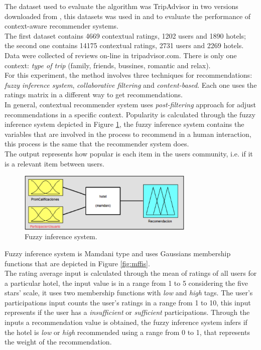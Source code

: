 The dataset used to evaluate the algorithm was TripAdvisor in two versions
downloaded from  \cite{linkzeng}, this datasets was used in
\cite{zheng2014context} and  \cite{zheng2012differential} to  evaluate
the performance of context-aware recommender systems. \\The first
dataset contains 4669 contextual ratings, 1202 users and 1890 hotels;
the second one contains 14175 contextual ratings, 2731 users and
2269 hotels.  Data were collected of reviews on-line in tripadvisor.com.
There is only one context: \textit{type of trip} (family, friends,
bussines, romantic and relax).\\ 
For this experiment, the method involves  three techniques 
for recommendations:  \textit{fuzzy inference system}, 
\textit{collaborative filtering} and \textit{content-based}. Each one 
uses the ratings matrix  in a different way to get recommendations.\\     
In general, contextual recommender system
uses  \textit{post-filtering} approach  \cite{adomavicius2011context}
for adjust recommendations in a specific context.
Popularity is calculated through the fuzzy inference system
depicted in Figure  \ref{fig:fis},  the fuzzy inference system
contains the variables that are involved in the process to recommend
in a human interaction, this process is the same that the recommender
system does. \\The output represents how popular is each item in the
users community, i.e. if it is a relevant item between users. \\ 
\begin{figure}
\captionsetup{justification=centering,margin=2cm,font=footnotesize}
\centering
\setlength\fboxsep{0pt}
\setlength\fboxrule{0.7pt}
\includegraphics[width=0.75\textwidth]{img/fis.png}
\caption{Fuzzy inference system.}
\label{fig:fis}   
\end{figure}
Fuzzy  inference system is Mamdani type and 
uses Gaussians membership
functions that are depicted in  Figure  \ref{fig:mffis}.\\ 
The rating average input is calculated through  the mean
of ratings of all users for a particular hotel, the input value is 
in a range from 1 to 5  considering the five stars' scale, it uses two
membership functions with  \textit{low} and  \textit{high} tags.
The user's participations input counts the user's ratings 
in a range from 1 to 10, this input represents if the user has 
a \textit{insufficient} or \textit{sufficient} participations. Through  the inputs
a recommendation value is obtained, the fuzzy inference system infers
 if the hotel is \textit{low} or \textit{high} recommended using a range
 from 0 to 1, that represents the weight of the recommendation. 

